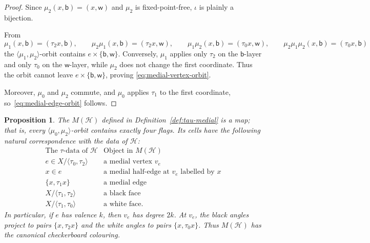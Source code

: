 \documentclass[10pt,a4paper]{article}
\newtheorem{proposition}[theorem]{Proposition}
\theoremstyle{definition}
\theoremstyle{remark}
\newcommand{\Hcal}{\mathcal{H}}
\begin{document}
\begin{proof}
Since $\mu_2(x,\mathsf b)=(x,\mathsf w)$ and $\mu_2$ is fixed-point-free, $\iota$ is plainly a bijection.

From
\[
 \mu_1(x,\mathsf b)=(\tau_2x,\mathsf b),\qquad\mu_2\mu_1(x,\mathsf b)=(\tau_2x,\mathsf w),\qquad
 \mu_1\mu_2(x,\mathsf b)=(\tau_0x,\mathsf w),\qquad
 \mu_2\mu_1\mu_2(x,\mathsf b)=(\tau_0x,\mathsf b)
\]
the $\langle\mu_1,\mu_2\rangle$-orbit contains $e\times\{\mathsf b,\mathsf w\}$. Conversely, $\mu_1$ applies only $\tau_2$ on the $\mathsf b$-layer and only $\tau_0$ on the $\mathsf w$-layer, while $\mu_2$ does not change the first coordinate. Thus the orbit cannot leave $e\times\{\mathsf b,\mathsf w\}$, proving
\eqref{eq:medial-vertex-orbit}.

Moreover, $\mu_0$ and $\mu_2$ commute, and $\mu_0$ applies $\tau_1$ to the first coordinate, so~\eqref{eq:medial-edge-orbit} follows.
\end{proof}

\begin{proposition}\label{prop:tau-medial}
The $M(\Hcal)$ defined in Definition~\ref{def:tau-medial} is a map; that is, every $\langle\mu_0,\mu_2\rangle$-orbit contains exactly four flags. Its cells have the following natural correspondence with the data of $\Hcal$:
\[
\begin{array}{c|c}
\text{The $\tau$-data of $\Hcal$} & \text{Object in $M(\Hcal)$}\\ \hline
 e\in X/\langle\tau_0,\tau_2\rangle & \text{a medial vertex }v_e\\
 x\in e & \text{a medial half-edge at $v_e$ labelled by $x$}\\
 \{x,\tau_1x\} & \text{a medial edge}\\
 X/\langle\tau_1,\tau_2\rangle & \text{a black face}\\
 X/\langle\tau_1,\tau_0\rangle & \text{a white face}.
\end{array}
\]
In particular, if $e$ has valence $k$, then $v_e$ has degree $2k$. At $v_e$, the black angles project to pairs $\{x,\tau_2x\}$ and the white angles to pairs $\{x,\tau_0x\}$. Thus $M(\Hcal)$ has the canonical checkerboard colouring.
\end{proposition}
\end{document}
